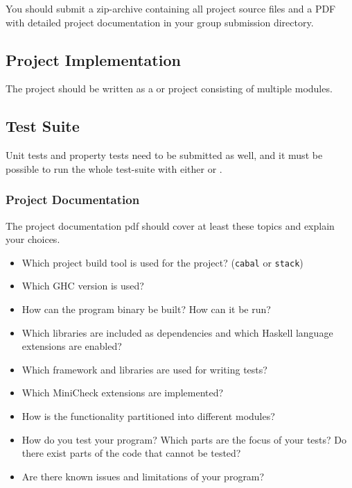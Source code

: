 \documentclass{article}
\begin{document}
You should submit a zip-archive containing all project source files and a PDF with detailed project documentation in your group submission directory.

\subsection{Project Implementation}

The project should be written as a  or  project consisting of multiple modules.

\subsection{Test Suite}

Unit tests and property tests need to be submitted as well, and it must be possible to run the whole test-suite with either  or .

\subsubsection*{Project Documentation}

The project documentation pdf should cover at least these topics and explain your choices.
\begin{itemize}
\item Which project build tool is used for the project? (\texttt{cabal} or \texttt{stack})
\item Which GHC version is used?
\item How can the program binary be built? How can it be run?
\item Which libraries are included as dependencies and which Haskell language extensions are enabled?
\item Which framework and libraries are used for writing tests?
\item Which MiniCheck extensions are implemented?
\item How is the functionality partitioned into different modules?
\item How do you test your program? Which parts are the focus of your tests? Do there exist parts of the code that cannot be tested?
\item Are there known issues and limitations of your program?
\end{itemize}


\printbibliography
\end{document}
